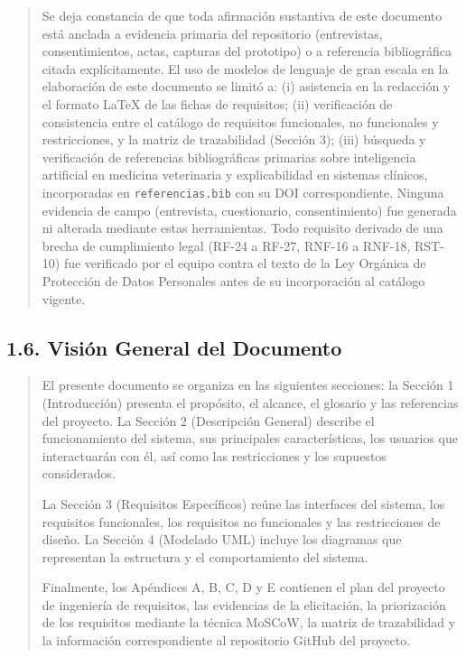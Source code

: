 \documentclass[
]{article}
\begin{document}
\begin{quote}
Se deja constancia de que toda afirmación sustantiva de este
documento está anclada a evidencia primaria del repositorio (entrevistas,
consentimientos, actas, capturas del prototipo) o a referencia
bibliográfica citada explícitamente. El uso de modelos de lenguaje de
gran escala en la elaboración de este documento se limitó a: (i)
asistencia en la redacción y el formato \LaTeX{} de las fichas de
requisitos; (ii) verificación de consistencia entre el catálogo de
requisitos funcionales, no funcionales y restricciones, y la matriz de
trazabilidad (Sección 3); (iii) búsqueda y verificación de referencias
bibliográficas primarias sobre inteligencia artificial en medicina
veterinaria y explicabilidad en sistemas clínicos, incorporadas en
\texttt{referencias.bib} con su DOI correspondiente. Ninguna evidencia de
campo (entrevista, cuestionario, consentimiento) fue generada ni
alterada mediante estas herramientas. Todo requisito derivado de una
brecha de cumplimiento legal (RF-24 a RF-27, RNF-16 a RNF-18, RST-10)
fue verificado por el equipo contra el texto de la Ley Orgánica de
Protección de Datos Personales antes de su incorporación al catálogo
vigente.
\end{quote}

\subsection{1.6. Visión General del
Documento}\label{visiuxf3n-general-del-documento}

\begin{quote}
El presente documento se organiza en las siguientes secciones: la
Sección 1 (Introducción) presenta el propósito, el alcance, el glosario
y las referencias del proyecto. La Sección 2 (Descripción General)
describe el funcionamiento del sistema, sus principales características,
los usuarios que interactuarán con él, así como las restricciones y los
supuestos considerados.

La Sección 3 (Requisitos Específicos) reúne las interfaces del sistema,
los requisitos funcionales, los requisitos no funcionales y las
restricciones de diseño. La Sección 4 (Modelado UML) incluye los
diagramas que representan la estructura y el comportamiento del sistema.

Finalmente, los Apéndices A, B, C, D y E contienen el plan del proyecto
de ingeniería de requisitos, las evidencias de la elicitación, la
priorización de los requisitos mediante la técnica MoSCoW, la matriz de
trazabilidad y la información correspondiente al repositorio GitHub del
proyecto.
\end{quote}
\end{document}
